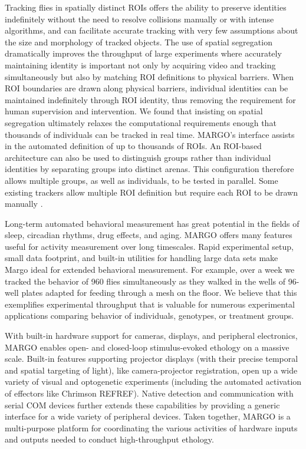 \documentclass[10pt]{article}
\begin{document}
\begin{multicols}{2}
Tracking flies in spatially distinct ROIs offers the ability to preserve identities indefinitely without the need to resolve collisions manually or with intense algorithms, and can facilitate accurate tracking with very few assumptions about the size and morphology of tracked objects. The use of spatial segregation dramatically improves the throughput of large experiments where accurately maintaining identity is important not only by acquiring video and tracking simultaneously but also by matching ROI definitions to physical barriers. When ROI boundaries are drawn along physical barriers, individual identities can be maintained indefinitely through ROI identity, thus removing the requirement for human supervision and intervention. We found that insisting on spatial segregation ultimately relaxes the computational requirements enough that thousands of individuals can be tracked in real time. MARGO's interface assists in the automated definition of up to thousands of ROIs. An ROI-based architecture can also be used to distinguish groups rather than individual identities by separating groups into distinct arenas. This configuration therefore allows multiple groups, as well as individuals, to be tested in parallel. Some existing trackers allow multiple ROI definition but require each ROI to be drawn manually \cite{Prez-Escudero_idTracker_2014,Mnck_BioTracker_2018}.

Long-term automated behavioral measurement has great potential in the fields of sleep, circadian rhythms, drug effects, and aging. MARGO offers many features useful for activity measurement over long timescales. Rapid experimental setup, small data footprint, and built-in utilities for handling large data sets make Margo ideal for extended behavioral measurement. For example, over a week we tracked the behavior of 960 flies simultaneously as they walked in the wells of 96-well plates adapted for feeding through a mesh on the floor. We believe that this exemplifies experimental throughput that is valuable for numerous experimental applications comparing behavior of individuals, genotypes, or treatment groups.  

With built-in hardware support for cameras, displays, and peripheral electronics, MARGO enables open- and closed-loop stimulus-evoked ethology on a massive scale. Built-in features supporting projector displays (with their precise temporal and spatial targeting of light), like camera-projector registration, open up a wide variety of visual and optogenetic experiments (including the automated activation of effectors like Chrimson REFREF). Native detection and communication with serial COM devices further extends these capabilities by providing a generic interface for a wide variety of peripheral devices. Taken together, MARGO is a multi-purpose platform for coordinating the various activities of hardware inputs and outputs needed to conduct high-throughput ethology. 


\end{multicols}
\end{document}

